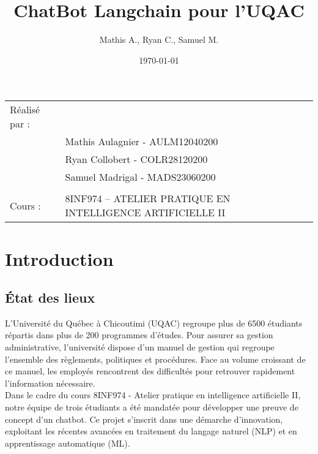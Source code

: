 \documentclass{article}
\title{ChatBot Langchain pour l'UQAC}
\author{Mathis A., Ryan C., Samuel M.}
\date{\today}
\begin{document}
\maketitle
\noindent\begin{tabular}{@{}ll}
    Réalisé par :\\
        & Mathis Aulagnier - AULM12040200 \\
        & Ryan Collobert - COLR28120200 \\
        & Samuel Madrigal - MADS23060200 \\
        \\
    Cours :  &  8INF974 – ATELIER PRATIQUE EN INTELLIGENCE ARTIFICIELLE II \\
\end{tabular}

\section{Introduction}

\subsection{État des lieux}
\quad L'Université du Québec à Chicoutimi (UQAC) regroupe plus de 6500 étudiants répartis dans plus de 200 programmes d'études. Pour assurer sa gestion administrative, l'université dispose d'un manuel de gestion qui regroupe l'ensemble des règlements, politiques et procédures. Face au volume croissant de ce manuel, les employés rencontrent des difficultés pour retrouver rapidement l'information nécessaire.\\

Dans le cadre du cours 8INF974 - Atelier pratique en intelligence artificielle II, notre équipe de trois étudiants a été mandatée pour développer une preuve de concept d'un chatbot. Ce projet s'inscrit dans une démarche d'innovation, exploitant les récentes avancées en traitement du langage naturel (NLP) et en apprentissage automatique (ML).
\end{document}
